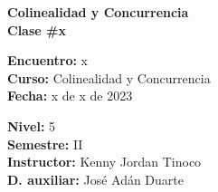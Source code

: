 \begin{center} \textbf
{
    \Large Colinealidad y Concurrencia \\ \vspace{2mm}Clase \#x
}
\end{center}

\begin{multicols}{2}
{
    \textbf{Encuentro:} x\\
    \textbf{Curso:} Colinealidad y Concurrencia\\
    \textbf{Fecha:} x de x de 2023\\
    \begin{flushright}
        \textbf{Nivel:} 5\\
        \textbf{Semestre:} II\\
        \textbf{Instructor:} Kenny Jordan Tinoco\\
        \textbf{D. auxiliar: }José Adán Duarte
    \end{flushright}
}
\end{multicols}

\thispagestyle{first-page-style}